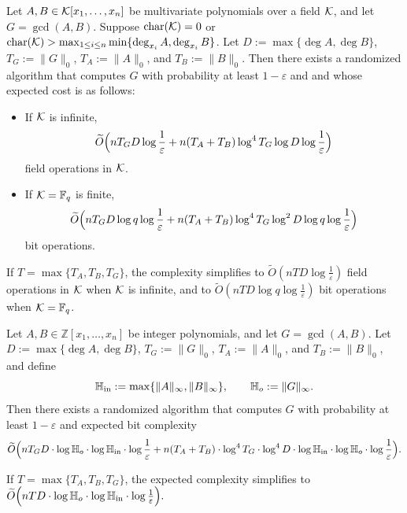 \documentclass{article}
\numberwithin{equation}{section}
\begin{document}
\begin{theorem}\label{thm:main-field}
Let $A, B \in {\mathcal{K}}[x_1, \dots, x_n]$ be multivariate polynomials over a field ${\mathcal{K}}$, and let $G = \gcd(A, B)$. 
Suppose $\operatorname{char}({\mathcal{K}}) = 0$ or $\operatorname{char}({\mathcal{K}}) > \max_{1 \le i \le n} \min\{\deg_{x_i} A, \deg_{x_i} B\}$. 
Let $D := \max\{\deg A, \deg B\}$, $T_G := \|G\|_0$, $T_A := \|A\|_0$, and $T_B := \|B\|_0$. 
Then there exists a randomized algorithm that computes $G$ with probability at least $1-\varepsilon$ and  and whose expected cost is as follows:

\begin{itemize}
    \item If ${\mathcal{K}}$ is infinite,
    \[
    \widetilde{O}\Bigl(
    n T_G D \log\frac{1}{\varepsilon}
    + n(T_A + T_B) \log^4 T_G \log D \log\frac{1}{\varepsilon}
    \Bigr)
    \]
    field operations in ${\mathcal{K}}$.

    \item If ${\mathcal{K}} = \mathbb{F}_q$ is finite,
    \[
    \widetilde{O}\Bigl(
    n T_G D \log q \log\frac{1}{\varepsilon}
    + n(T_A + T_B) \log^4 T_G \log^2 D \log q \log\frac{1}{\varepsilon}
    \Bigr)
    \]
    bit operations.
\end{itemize}
%
If $T = \max\{T_A, T_B, T_G\}$, the complexity simplifies to $\widetilde{O}( n T D \log\frac{1}{\varepsilon})$ field operations in ${\mathcal{K}}$ when ${\mathcal{K}}$ is infinite, and to $\widetilde{O}( n T D \log q \log\frac{1}{\varepsilon})$ bit operations when ${\mathcal{K}} = \mathbb{F}_q$.
\end{theorem}


\begin{theorem}\label{thm:main-integer}
Let $A, B \in \mathbb{Z}[x_1, \dots, x_n]$ be integer polynomials, and let $G = \gcd(A, B)$. 
Let $D := \max\{\deg A, \deg B\}$, $T_G := \|G\|_0$, $T_A := \|A\|_0$, and $T_B := \|B\|_0$, and define
\[
\mathbb{H}_{\rm in} := \max\{\|A\|_\infty, \|B\|_\infty\}, \qquad \mathbb{H}_{o} := \|G\|_\infty.
\]
Then there exists a randomized algorithm that computes $G$ with probability at least $1-\varepsilon$ and expected bit complexity
\[
\widetilde{O}\Bigl( 
n T_G D \cdot \log\mathbb{H}_{o} \cdot \log\mathbb{H}_{\rm in} \cdot \log\frac{1}{\varepsilon}
+ n (T_A + T_B) \cdot \log^4 T_G \cdot \log^4 D \cdot \log \mathbb{H}_{\rm in} \cdot \log\mathbb{H}_{o} \cdot \log\frac{1}{\varepsilon}
\Bigr).
\]

If $T = \max\{T_A, T_B, T_G\}$, the expected complexity simplifies to
%
$\widetilde{O}\Bigl( 
n T D \cdot \log\mathbb{H}_{o} \cdot \log\mathbb{H}_{\rm in} \cdot \log\frac{1}{\varepsilon}
\Bigr).$
\end{theorem}
\end{document}

